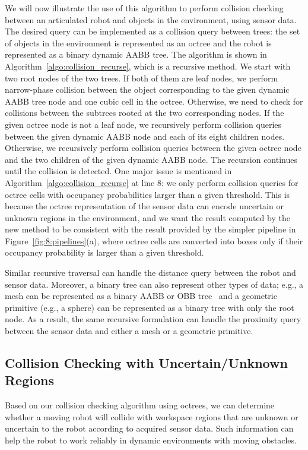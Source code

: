 We will now illustrate the use of this algorithm to perform collision
checking between an articulated
robot and objects in the environment, using sensor data. The desired query can be implemented as a collision
query between trees: the set of objects in the environment is represented as an octree and
the robot is represented as a binary dynamic AABB tree. The algorithm
is shown in Algorithm~\ref{algo:collision_recurse}, which is a
recursive method. We start with two root nodes of the two trees. If
both of them are leaf nodes, we perform narrow-phase collision
between the object corresponding to the given dynamic AABB tree node
and one cubic cell in the octree. Otherwise, we need to check for
collisions between the subtrees rooted at the two corresponding nodes. If the
given octree node is not a leaf node, we recursively perform collision queries
between the given dynamic AABB
node and each of its eight children nodes. Otherwise, we recursively perform collision queries between the given
octree node and the two children of the given dynamic AABB node. The
recursion continues until the collision is detected. One major issue is mentioned in Algorithm~\ref{algo:collision_recurse} at line $8$: we only perform
collision queries for octree cells with occupancy probabilities larger than a
given threshold. This is because the octree representation of the sensor data can encode uncertain or
unknown regions in the environment, and we want the result computed by
the new method to be consistent with the result provided by the simpler
pipeline in Figure~\ref{fig:8:pipelines}(a), where octree cells are
converted into boxes only if their occupancy probability is larger
than a given threshold.

Similar recursive traversal can handle the distance
query between the robot and sensor data. Moreover, a binary tree
can also represent other types of data; e.g., a mesh can be
represented as a binary AABB or OBB tree~\cite{Pan:ICRA:2012} and a
geometric primitive (e.g., a sphere) can be represented as a binary
tree with only the root node. As a result, the same recursive formulation can handle the proximity query between the sensor data and
either a mesh or a geometric primitive.


\subsection{Collision Checking with Uncertain/Unknown Regions}
Based on our collision checking algorithm using octrees, we can determine whether a moving robot will collide with workspace regions that are unknown or uncertain to the robot according to acquired sensor data. Such information can help the robot to work reliably in dynamic environments with moving obstacles. 

